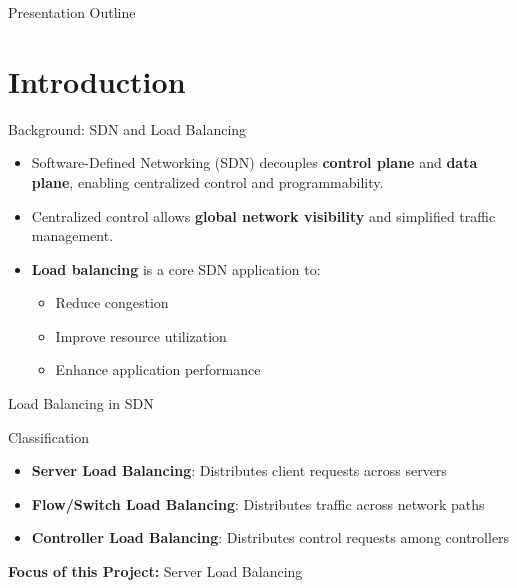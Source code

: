 \documentclass[aspectratio=169]{beamer}
\begin{document}
\begin{frame}
  \titlepage
\end{frame}

\begin{frame}{Presentation Outline}
  \tableofcontents
\end{frame}


\section{Introduction}

\begin{frame}{Background: SDN and Load Balancing}
\begin{itemize}
    \item Software-Defined Networking (SDN) decouples \textbf{control plane} and \textbf{data plane}, enabling centralized control and programmability.
    \item Centralized control allows \textbf{global network visibility} and simplified traffic management.
    \item \textbf{Load balancing} is a core SDN application to:
    \begin{itemize}
        \item Reduce congestion
        \item Improve resource utilization
        \item Enhance application performance
    \end{itemize}
\end{itemize}
\end{frame}

\begin{frame}{Load Balancing in SDN}
\begin{block}{Classification}
\begin{itemize}
    \item \textbf{Server Load Balancing}: Distributes client requests across servers
    \item \textbf{Flow/Switch Load Balancing}: Distributes traffic across network paths
    \item \textbf{Controller Load Balancing}: Distributes control requests among controllers
\end{itemize}
\end{block}

\vspace{0.5em}
\textbf{Focus of this Project:} \alert{Server Load Balancing}
\end{frame}
\end{document}
